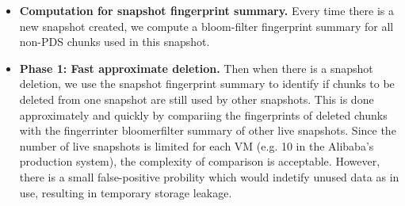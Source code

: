 \begin{itemize}
\item {\bf Computation for snapshot fingerprint summary.}
Every time there is a new snapshot created,
we compute a bloom-filter fingerprint summary for all non-PDS chunks used 
in this snapshot.

\item {\bf Phase 1: Fast approximate deletion.}
Then when there is a snapshot deletion, 
we use  the snapshot fingerprint summary to identify if  chunks to be deleted from one snapshot
are still used by other snapshots. 
This is done approximately and quickly by compariing the fingerprints of deleted chunks with
the fingerrinter bloomerfilter summary of other live snapshots.
Since the number of live snapshots is limited for each VM (e.g. 10 in the Alibaba's production system), 
the complexity of comparison is acceptable.
However, there is a small false-positive probility which
would indetify unused data as in use, resulting in temporary storage leakage.


\end{itemize}
